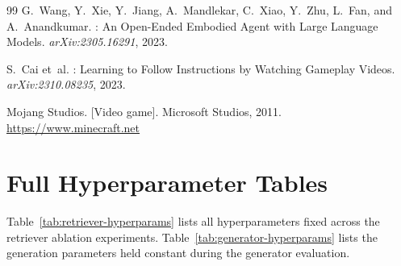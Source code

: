 \documentclass[11pt,a4paper]{article}
\begin{document}
\begin{thebibliography}{99}
G.~Wang, Y.~Xie, Y.~Jiang, A.~Mandlekar, C.~Xiao, Y.~Zhu, L.~Fan, and A.~Anandkumar.
: An Open-Ended Embodied Agent with Large Language Models.
\newblock \textit{arXiv:2305.16291}, 2023.

S.~Cai et~al.
: Learning to Follow Instructions by Watching Gameplay Videos.
\newblock \textit{arXiv:2310.08235}, 2023.

Mojang Studios.
 [Video game].
\newblock Microsoft Studios, 2011.
\newblock \url{https://www.minecraft.net}

\end{thebibliography}

\appendix

\section{Full Hyperparameter Tables}
\label{app:hyperparams}

Table~\ref{tab:retriever-hyperparams} lists all hyperparameters fixed across the retriever ablation experiments. Table~\ref{tab:generator-hyperparams} lists the generation parameters held constant during the generator evaluation.
\end{document}

